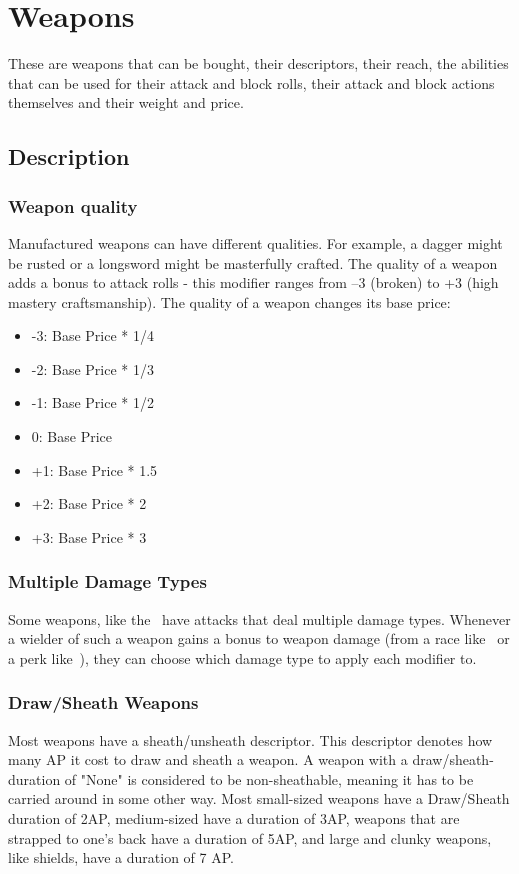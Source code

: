\chapter{Weapons}\label{ch:weapons}
These are weapons that can be bought, their descriptors, their reach, the abilities that can be used for their attack and block rolls, their attack and block actions themselves and their weight and price.\\
\section{Description}\label{sec:weaponDescription}
\subsection{Weapon quality}\label{subsec:weaponQuality}
Manufactured weapons can have different qualities.
For example, a dagger might be rusted or a longsword might be masterfully crafted.
The quality of a weapon adds a bonus to attack rolls - this modifier ranges from --3 (broken) to +3 (high mastery craftsmanship).
The quality of a weapon changes its base price:\\

\begin{itemize}
    \item -3: Base Price * 1/4
    \item -2: Base Price * 1/3
    \item -1: Base Price * 1/2
    \item 0: Base Price
    \item +1: Base Price * 1.5
    \item +2: Base Price * 2
    \item +3: Base Price * 3
\end{itemize}

\subsection{Multiple Damage Types}\label{subsec:multipleDamageTypeWeapons}
Some weapons, like the~ have attacks that deal multiple damage types.
Whenever a wielder of such a weapon gains a bonus to weapon damage (from a race like~ or a perk like~), they can choose which damage type to apply each modifier to.

\subsection{Draw/Sheath Weapons}\label{subsec:sheathWeapons}
Most weapons have a sheath/unsheath descriptor.
This descriptor denotes how many AP it cost to draw and sheath a weapon.
A weapon with a draw/sheath-duration of "None" is considered to be non-sheathable, meaning it has to be carried around in some other way.
Most small-sized weapons have a Draw/Sheath duration of 2AP, medium-sized have a duration of 3AP, weapons that are strapped to one's back have a duration of 5AP, and large and clunky weapons, like shields, have a duration of 7 AP.

